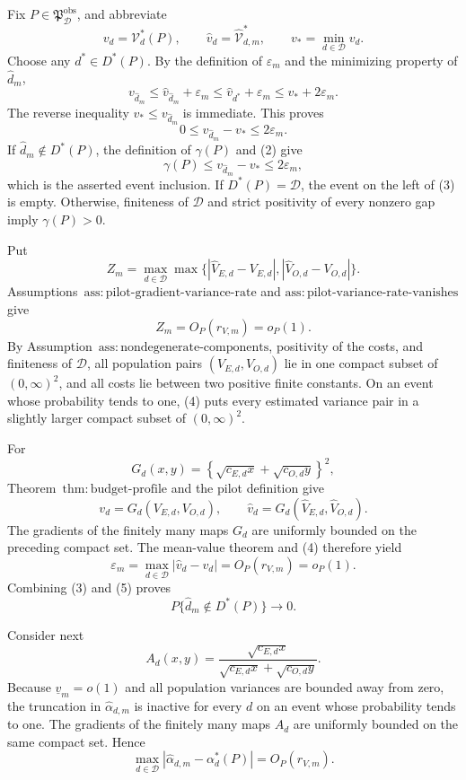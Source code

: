 Fix \(P\in\mathfrak P_{\mathcal D}^{\mathrm{obs}}\), and abbreviate
\[
 v_d=\mathcal V_d^*(P),\qquad
 \widehat v_d=\widehat{\mathcal V}_{d,m}^*,\qquad
 v_*=\min_{d\in\mathcal D}v_d.
\]
Choose any \(d^*\in D^*(P)\).  By the definition of \(\varepsilon_m\) and the minimizing property of \(\widehat d_m\),
\[
 v_{\widehat d_m}
 \le \widehat v_{\widehat d_m}+\varepsilon_m
 \le \widehat v_{d^*}+\varepsilon_m
 \le v_*+2\varepsilon_m.                                      \tag{1}
\]
The reverse inequality \(v_*\le v_{\widehat d_m}\) is immediate.  This proves
\[
 0\le v_{\widehat d_m}-v_*\le2\varepsilon_m.                  \tag{2}
\]
If \(\widehat d_m\notin D^*(P)\), the definition of \(\gamma(P)\) and (2) give
\[
 \gamma(P)\le v_{\widehat d_m}-v_*\le2\varepsilon_m,          \tag{3}
\]
which is the asserted event inclusion.  If \(D^*(P)=\mathcal D\), the event on the left of (3) is empty.  Otherwise, finiteness of \(\mathcal D\) and strict positivity of every nonzero gap imply \(\gamma(P)>0\).

Put
\[
 Z_m=\max_{d\in\mathcal D}\max\bigl\{
 |\widehat V_{E,d}-V_{E,d}|,
 |\widehat V_{O,d}-V_{O,d}|\bigr\}.
\]
Assumptions~\(\mathrm{ass{:}pilot\text{-}gradient\text{-}variance\text{-}rate}\) and \(\mathrm{ass{:}pilot\text{-}variance\text{-}rate\text{-}vanishes}\) give
\[
 Z_m=O_P(r_{V,m})=o_P(1).                                     \tag{4}
\]
By Assumption~\(\mathrm{ass{:}nondegenerate\text{-}components}\), positivity of the costs, and finiteness of \(\mathcal D\), all population pairs \((V_{E,d},V_{O,d})\) lie in one compact subset of \((0,\infty)^2\), and all costs lie between two positive finite constants.  On an event whose probability tends to one, (4) puts every estimated variance pair in a slightly larger compact subset of \((0,\infty)^2\).

For
\[
 G_d(x,y)=\left\{\sqrt{c_{E,d}x}+\sqrt{c_{O,d}y}\right\}^2,
\]
Theorem~\(\mathrm{thm{:}budget\text{-}profile}\) and the pilot definition give
\[
 v_d=G_d(V_{E,d},V_{O,d}),
 \qquad
 \widehat v_d=G_d(\widehat V_{E,d},\widehat V_{O,d}).
\]
The gradients of the finitely many maps \(G_d\) are uniformly bounded on the preceding compact set.  The mean-value theorem and (4) therefore yield
\[
 \varepsilon_m=\max_{d\in\mathcal D}|\widehat v_d-v_d|
 =O_P(r_{V,m})=o_P(1).                                       \tag{5}
\]
Combining (3) and (5) proves
\[
 P\{\widehat d_m\notin D^*(P)\}\longrightarrow0.             \tag{6}
\]

Consider next
\[
 A_d(x,y)=
 \frac{\sqrt{c_{E,d}x}}
 {\sqrt{c_{E,d}x}+\sqrt{c_{O,d}y}}.
\]
Because \(\underline v_m=o(1)\) and all population variances are bounded away from zero, the truncation in \(\widehat\alpha_{d,m}\) is inactive for every \(d\) on an event whose probability tends to one.  The gradients of the finitely many maps \(A_d\) are uniformly bounded on the same compact set.  Hence
\[
 \max_{d\in\mathcal D}
 |\widehat\alpha_{d,m}-\alpha_d^*(P)|=O_P(r_{V,m}).            \tag{7}
\]

